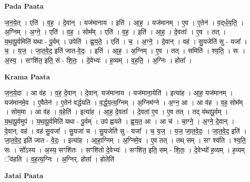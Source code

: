 \documentclass[17pt]{extarticle}
\begin{document}
\textbf{Pada Paata} \newline

ज॒न॒ये॒त् । एति॑ । व॒ह॒ । दे॒वान् । यज॑मानाय । इति॑ । आ॒ह॒ । यज॑मानम् । ए॒व । ए॒तेन॑ । व॒द्‌र्ध॒य॒ति॒ । अ॒ग्निम् । अ॒ग्ने॒ । एति॑ । व॒ह॒ । सोम᳚म् । एति॑ । व॒ह॒ । इति॑ । आ॒ह॒ । दे॒वताः᳚ । ए॒व । तत् । य॒था॒पू॒र्वमिति॑ यथा - पू॒र्वम् । उपेति॑ । ह्व॒य॒ते॒ । एति॑ । च॒ । अ॒ग्ने॒ । दे॒वान् । वह॑ । सु॒यजेति॑ सु - यजा᳚ । च॒ । य॒ज॒ । जा॒त॒वे॒द॒ इति॑ जात-वे॒दः॒ । इति॑ । आ॒ह॒ । अ॒ग्निम् । ए॒व । तत् । समिति॑ । श्य॒ति॒ । सः । अ॒स्य॒ । सꣳशि॑त॒ इति॒ सं - शि॒तः॒ । दे॒वेभ्यः॑ । ह॒व्यम् । व॒ह॒ति॒ । अ॒ग्निः । होता᳚ ।  \newline


\textbf{Krama Paata} \newline

ज॒न॒ये॒दा । आ व॑ह । व॒ह॒ दे॒वान् । दे॒वान्. यज॑मानाय । यज॑माना॒येति॑ । इत्या॑ह । आ॒ह॒ यज॑मानम् । यज॑मानमे॒व । ए॒वैतेन॑ । ए॒तेन॑ वर्द्धयति । व॒र्द्ध॒य॒त्य॒ग्निम् । अ॒ग्निम॑ग्ने । अ॒ग्न॒ आ । आ व॑ह । व॒ह॒ सोम᳚म् । सोम॒मा । आ व॑ह । व॒हेति॑ । इत्या॑ह । आ॒ह॒ दे॒वताः᳚ । दे॒वता॑ ए॒व । ए॒व तत् । तद् य॑थापू॒र्वम् । य॒था॒पू॒र्वमुप॑ । य॒था॒पू॒र्वमिति॑ यथा - पू॒र्वम् । उप॑ ह्वयते । ह्व॒य॒त॒ आ । आ च॑ । चा॒ग्ने॒ । अ॒ग्ने॒ दे॒वान् । दे॒वान्. वह॑ । वह॑ सु॒यजा᳚ । सु॒यजा॑ च । सु॒यजेति॑ सु - यजा᳚ । च॒ य॒ज॒ । य॒ज॒ जा॒त॒वे॒दः॒ । जा॒त॒वे॒द॒ इति॑ । जा॒त॒वे॒द॒ इति॑ जात - वे॒दः॒ । इत्या॑ह । आ॒हा॒ग्निम् । 
अ॒ग्निमे॒व । ए॒व तत् । तथ् सम् । सꣳ श्य॑ति । श्य॒ति॒ सः । सो᳚ऽस्य । अ॒स्य॒ सꣳशि॑तः । सꣳशि॑तो दे॒वेभ्यः॑ । सꣳशि॑त॒ इति॒ सम् - शि॒तः॒ । दे॒वेभ्यो॑ ह॒व्यम् । ह॒व्यम् ॅव॑हति । व॒ह॒त्य॒ग्निः । अ॒ग्निर्. होता᳚ । होतेति॑ \newline

\textbf{Jatai Paata} \newline
\end{document}
